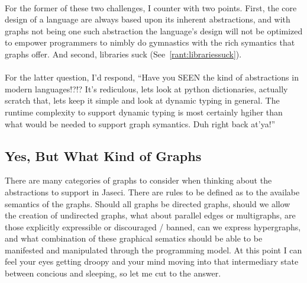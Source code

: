 \documentclass{book}
\begin{document}
\paragraph{}
For the former of these two challenges, I counter with two points. First, the core design of a language are always based upon its inherent abstractions, and with graphs not being one such abstraction the language's design will not be optimized to empower programmers to nimbly do gymnastics with the rich symantics that graphs offer. And second, libraries suck (See~\ref{rant:librariessuck}).
\paragraph{}
For the latter question, I'd respond, ``Have you SEEN the kind of abstractions in modern languages!?!? It's rediculous, lets look at python dictionaries, actually scratch that, lets keep it simple and look at dynamic typing in general. The runtime complexity to support dynamic typing is most certainly hgiher than what would be needed to support graph symantics. Duh right back at'ya!''
\subsection{Yes, But What Kind of Graphs}

There are many categories of graphs to consider when thinking about the abstractions to support in Jaseci. There are rules to be defined as to the availabe semantics of the graphs. Should all graphs be \gls{directed graphs}, should we allow the creation of \gls{undirected graphs}, what about parallel edges or \gls{multigraphs}, are those explicitly expressible or discouraged / banned, can we express \gls{hypergraphs}, and what combination of these graphical sematics should be able to be manifested and manipulated through the programming model. At this point I can feel your eyes getting droopy and your mind moving into that intermediary state between concious and sleeping, so let me cut to the answer.
\end{document}
